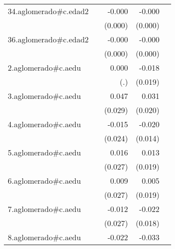 {\begin{longtable}{l*{4}{D{.}{.}{-1}}}
\addlinespace
34.aglomerado#c.edad2&                     &      -0.000         &      -0.000\sym{**} &                     \\
            &                     &     (0.000)         &     (0.000)         &                     \\
\addlinespace
36.aglomerado#c.edad2&                     &      -0.000         &      -0.000\sym{*}  &                     \\
            &                     &     (0.000)         &     (0.000)         &                     \\
\addlinespace
2.aglomerado#c.aedu&                     &       0.000         &      -0.018         &                     \\
            &                     &         (.)         &     (0.019)         &                     \\
\addlinespace
3.aglomerado#c.aedu&                     &       0.047         &       0.031         &                     \\
            &                     &     (0.029)         &     (0.020)         &                     \\
\addlinespace
4.aglomerado#c.aedu&                     &      -0.015         &      -0.020         &                     \\
            &                     &     (0.024)         &     (0.014)         &                     \\
\addlinespace
5.aglomerado#c.aedu&                     &       0.016         &       0.013         &                     \\
            &                     &     (0.027)         &     (0.019)         &                     \\
\addlinespace
6.aglomerado#c.aedu&                     &       0.009         &       0.005         &                     \\
            &                     &     (0.027)         &     (0.019)         &                     \\
\addlinespace
7.aglomerado#c.aedu&                     &      -0.012         &      -0.022         &                     \\
            &                     &     (0.027)         &     (0.018)         &                     \\
\addlinespace
8.aglomerado#c.aedu&                     &      -0.022         &      -0.033         &                     \\

\end{longtable}}
